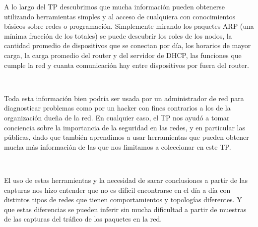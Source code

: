 A lo largo del TP descubrimos que mucha información pueden obtenerse utilizando herramientas simples y al acceso de cualquiera con conocimientos básicos sobre redes o programación. Simplemente mirando los paquetes ARP (una mínima fracción de los totales) se puede descubrir los roles de los nodos, la cantidad promedio de dispositivos que se conectan por día, los horarios de mayor carga, la carga promedio del router y del servidor de DHCP, las funciones que cumple la red y
cuanta comunicación hay entre dispositivos por fuera del router.

~

Toda esta información bien podría ser usada por un administrador de red para diagnosticar problemas como por un hacker con fines contrarios a los de la organización dueña de la red. En cualquier caso, el TP nos ayudó a tomar conciencia sobre la importancia de la seguridad en las redes, y en particular las públicas, dado que también aprendimos a usar herramientas que pueden obtener mucha más información de las que nos limitamos a coleccionar en este TP.

~

El uso de estas herramientas y la necesidad de sacar conclusiones a partir de las capturas nos hizo entender que no es difícil encontrarse en el día a día con distintos tipos de redes que tienen comportamientos y topologías diferentes. Y que estas diferencias se pueden inferir sin mucha dificultad a partir de muestras de las capturas del tráfico de los paquetes en la red.